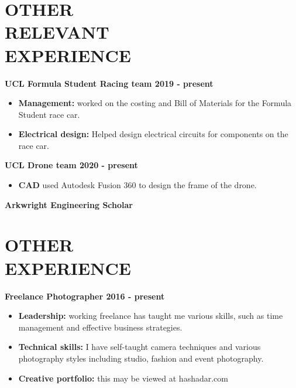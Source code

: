 \documentclass[margin, 10pt]{res} %
\begin{document}
\begin{resume}

\section{OTHER \\RELEVANT \\EXPERIENCE} 

\textbf{UCL Formula Student Racing team \hfill 2019 - present}
\\
\begin{itemize}
  \item \textbf{Management:} worked on the costing and Bill of Materials for the Formula Student race car.
  \item \textbf{Electrical design:} Helped design electrical circuits for components on the race car.
\end{itemize}

\textbf{UCL Drone team \hfill 2020 - present}
\\
\begin{itemize}
  \item \textbf{CAD} used Autodesk Fusion 360 to design the frame of the drone.
\end{itemize}

\textbf{Arkwright Engineering Scholar}
 
 
\section{OTHER \\ EXPERIENCE}
\textbf{Freelance Photographer \hfill 2016 - present}
\\
\begin{itemize}
  \item \textbf{Leadership:} working freelance has taught me various skills, such as time management and effective business strategies.
  \item \textbf{Technical skills:} I have self-taught camera techniques and various photography styles including studio, fashion and event photography.
  \item \textbf{Creative portfolio:} this may be viewed at hashadar.com
\end{itemize}


\end{resume}
\end{document}

